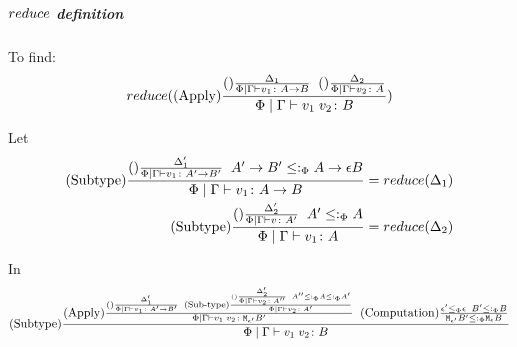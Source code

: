 {            
            \subparagraph{$reduce$ definition}
            To find:
            \begin{equation}
                reduce((\text{Apply}) \frac{
                    (\text{}) \frac{\Delta_1}{
                        \Phi\mid\Gamma \vdash v_1 \colon A\rightarrow B
                    }
                    \;\;
                    (\text{}) \frac{\Delta_2}{
                        \Phi\mid\Gamma \vdash v_2 \colon A
                    }
                }{
                    \Phi\mid\Gamma \vdash v_1\; v_2 \colon B
                })
            \end{equation}

            Let
            \begin{align}
                (\text{Subtype}) \frac{
                    (\text{}) \frac{\Delta'_1}{\Phi\mid\Gamma \vdash v_1 \colon A'\rightarrow B'}
                    \;\;
                    A'\rightarrow B'\leq:_\Phi A\rightarrow \epsilon{B}
                }{
                    \Phi\mid\Gamma \vdash v_1 \colon A\rightarrow B
                } & = reduce(\Delta_1)\\
                (\text{Subtype}) \frac{
                    (\text{}) \frac{\Delta'_2}{\Phi\mid\Gamma \vdash v \colon A'}
                    \;\;
                    A'\leq:_\Phi A
                }{
                    \Phi\mid\Gamma \vdash v_1 \colon A
                } & = reduce(\Delta_2)
            \end{align}

            In
            \begin{equation}
                (\text{Subtype}) \frac{
                    (\text{Apply}) \frac{
                        (\text{}) \frac{
                            \Delta'_1
                        }{
                            \Phi\mid\Gamma \vdash v_1 \colon A'\rightarrow B'
                        }
                    \;\;
                        (\text{Sub-type}) \frac{
                            (\text{}) \frac{\Delta'_2}{\Phi\mid\Gamma \vdash v_2 \colon A''}
                            \;\;
                            A'' \leq:_\Phi A \leq:_\Phi A'
                        }{
                            \Phi\mid\Gamma \vdash v_2 \colon A'
                        }
                    }{
                        \Phi\mid\Gamma \vdash v_1\; v_2 \colon \texttt{M}_{\epsilon'}{B'}
                    }
                    \;\;
                    (\text{Computation}) \frac{ \epsilon'\leq_{\Phi} \epsilon\;\; B' \leq:_\Phi B }{\texttt{M}_{\epsilon'}{ B' }\leq:_\Phi\texttt{M}_{\epsilon}{B}}
                }{
                    \Phi\mid\Gamma \vdash v_1\; v_2 \colon B
                }
            \end{equation}
            
           
}
